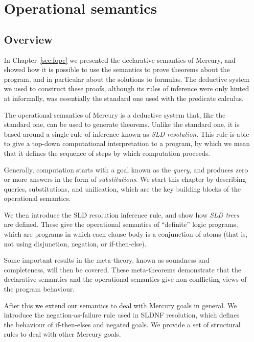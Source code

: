 \chapter{Operational semantics}
\label{sec:op-sem}

\section{Overview}

In Chapter~\ref{sec:fopc}
we presented the declarative semantics of Mercury,
and showed how it is possible to use the semantics
to prove theorems about the program,
and in particular about the solutions to formulas.
The deductive system we used to construct these proofs,
although its rules of inference were only hinted at informally,
was essentially the standard one
used with the predicate calculus.

The operational semantics of Mercury
is a deductive system that,
like the standard one,
can be used to generate theorems.
Unlike the standard one,
it is based around a single rule of inference
known as \emph{SLD resolution}.
This rule is able to give a top-down
computational interpretation to a program,
by which we mean that it
defines the sequence of steps by which computation proceeds.

Generally,
computation starts with a goal known as the \emph{query},
and produces zero or more answers in the form of \emph{substitutions}.
We start this chapter by describing queries, substitutions, and unification,
which are the key building blocks of the operational semantics.

We then introduce the SLD resolution inference rule,
and show how \emph{SLD trees} are defined.
These give the operational semantics
of ``definite\label{gi:definite}'' logic programs,
which are programs in which each clause body
is a conjunction of atoms
(that is, not using disjunction, negation, or if-then-else).

Some important results in the meta-theory,
known as soundness and completeness,
will then be covered.
These meta-theorems demonstrate that
the declarative semantics and the operational semantics
give non-conflicting views of the program behaviour.

After this we extend our semantics to deal with Mercury goals in general.
We introduce the negation-as-failure rule used in SLDNF resolution,
which defines the behaviour of if-then-elses and negated goals.
We provide a set of structural rules to deal with
other Mercury goals.

